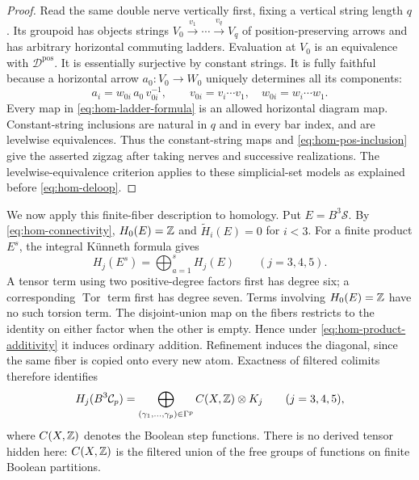 \begin{proof}
Read the same double nerve vertically first, fixing a vertical
string length $q$.  Its groupoid has objects strings
$V_0\xrightarrow{v_1}\cdots\xrightarrow{v_q}V_q$ of
position-preserving arrows and has arbitrary horizontal commuting
ladders.  Evaluation at $V_0$ is an equivalence with
$\mathcal D^{\mathrm{pos}}$.  It is essentially surjective by
constant strings.  It is fully faithful because a horizontal
arrow $a_0:V_0\to W_0$ uniquely determines all its components:
\begin{equation}\label{eq:hom-ladder-formula}
 a_i=w_{0i}\,a_0\,v_{0i}^{-1},
 \qquad v_{0i}=v_i\cdots v_1,
 \quad w_{0i}=w_i\cdots w_1.
\end{equation}
Every map in \eqref{eq:hom-ladder-formula} is an allowed
horizontal diagram map.  Constant-string inclusions are natural
in $q$ and in every bar index, and are levelwise equivalences.
Thus the constant-string maps and
\eqref{eq:hom-pos-inclusion} give the asserted zigzag after taking
nerves and successive realizations.  The levelwise-equivalence
criterion applies to these simplicial-set models as explained
before \eqref{eq:hom-deloop}.
\end{proof}

We now apply this finite-fiber description to homology.
Put $E=B^3\mathcal S$.  By \eqref{eq:hom-connectivity},
$H_0(E)=\mathbb Z$ and $\widetilde H_i(E)=0$ for $i<3$.
For a finite product $E^s$, the integral K\"unneth formula gives
\begin{equation}\label{eq:hom-product-additivity}
 H_j(E^s)=\bigoplus_{a=1}^s H_j(E)
 \qquad(j=3,4,5).
\end{equation}
A tensor term using two positive-degree factors first has degree
six; a corresponding $\operatorname{Tor}$ term first has degree
seven.  Terms involving $H_0(E)=\mathbb Z$ have no such torsion term.
The disjoint-union map on the fibers restricts to the identity
on either factor when the other is empty.  Hence under
\eqref{eq:hom-product-additivity} it induces ordinary addition.
Refinement induces the diagonal, since the same fiber is copied
onto every new atom.  Exactness of filtered colimits therefore
identifies
\begin{equation}\label{eq:hom-trajectory-chains}
 H_j(B^3\mathcal C_p)
  =\bigoplus_{(\gamma_1,\ldots,\gamma_p)\in\Gamma^p}
        C(X,\mathbb Z)\otimes K_j\qquad(j=3,4,5),
\end{equation}
where $C(X,\mathbb Z)$ denotes the Boolean step functions.  There is
no derived tensor hidden here: $C(X,\mathbb Z)$ is the filtered union
of the free groups of functions on finite Boolean partitions.

